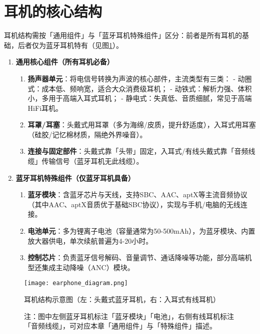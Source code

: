 \documentclass[UTF8]{ctexart}
\begin{document}
\section{耳机的核心结构}
耳机结构需按「通用组件」与「蓝牙耳机特殊组件」区分：前者是所有耳机的基础，后者仅为蓝牙耳机特有（见图\ref{fig:earphone_structure}）。

\begin{enumerate}[label={\arabic*.}, itemsep=6pt]  %
    \item \textbf{通用核心组件（所有耳机必备）}
    \begin{enumerate}[label={\arabic{enumi}-\arabic*.}, itemsep=3pt]  %
        \item \textbf{扬声器单元}：将电信号转换为声波的核心部件，主流类型有三类：
              - 动圈式：成本低、频响宽，适合大众消费级耳机；
              - 动铁式：解析力强、体积小，多用于高端入耳式耳机；
              - 静电式：失真低、音质细腻，常见于高端HiFi耳机。
        \item \textbf{耳罩/耳塞}：头戴式用耳罩（多为海绵/皮质，提升舒适度），入耳式用耳塞（硅胶/记忆棉材质，隔绝外界噪音）。
        \item \textbf{连接与固定部件}：头戴式靠「头带」固定，入耳式/有线头戴式靠「音频线缆」传输信号（蓝牙耳机无此线缆）。
    \end{enumerate}

    \item \textbf{蓝牙耳机特殊组件（仅蓝牙耳机具备）}
    \begin{enumerate}[label={\arabic{enumi}-\arabic*.}, itemsep=3pt]
        \item \textbf{蓝牙模块}：含蓝牙芯片与天线，支持SBC、AAC、aptX等主流音频协议（其中AAC、aptX音质优于基础SBC协议），实现与手机/电脑的无线连接。
        \item \textbf{电池单元}：多为锂离子电池（容量通常为50-500mAh），为蓝牙模块、内置放大器供电，单次续航普遍为4-20小时。
        \item \textbf{控制芯片}：负责蓝牙信号解码、音量调节、通话降噪等功能，部分高端机型还集成主动降噪（ANC）模块。
    \end{enumerate}
\end{enumerate}

\begin{figure}[htbp]
    \centering
    \texttt{[image: earphone\_diagram.png]}  %
    \caption{耳机结构示意图（左：头戴式蓝牙耳机，右：入耳式有线耳机）}
    \label{fig:earphone_structure}
    \caption*{注：图中左侧蓝牙耳机标注「蓝牙模块」「电池」，右侧有线耳机标注「音频线缆」，可对应本章「通用组件」与「特殊组件」描述。}
\end{figure}
\clearpage
\end{document}
